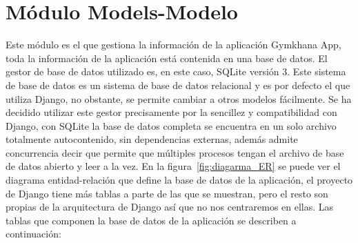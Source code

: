 \documentclass[a4paper, 12pt]{book}
\begin{document}
\section{Módulo Models-Modelo}
Este módulo es el que gestiona la información de la aplicación Gymkhana App, toda la información de la aplicación está contenida en una base de datos. El gestor de base de datos utilizado es, en este caso, SQLite versión 3. Este sistema de base de datos es un sistema de base de datos relacional y es por defecto el que utiliza Django, no obstante, se permite cambiar a otros modelos fácilmente. Se ha decidido utilizar este gestor precisamente por la sencillez y compatibilidad con Django, con SQLite la base de datos completa se encuentra en un solo archivo totalmente autocontenido, sin dependencias externas, además admite concurrencia decir que permite que múltiples procesos tengan el archivo de base de datos abierto y leer a la vez. En la figura~\ref{fig:diagarma_ER} se puede ver el diagrama entidad-relación que define la base de datos de la aplicación, el proyecto de Django tiene más tablas a parte de las que se muestran, pero el resto son propias de la arquitectura de Django así que no nos centraremos en ellas. Las tablas que componen la base de datos de la aplicación se describen a continuación:
\end{document}
